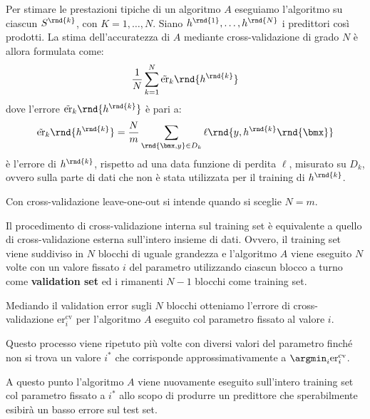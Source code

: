 \documentclass[\main/main.tex]{subfiles}
\begin{document}
\begin{multicols}{2}
\begin{observation}
        Per stimare le prestazioni tipiche di un algoritmo \(A\) eseguiamo l'algoritmo su ciascun \(S^{\rnd{k}}\), con \(K = 1, \ldots, N\). Siano \(h^{\rnd{1}}, \ldots, h^{\rnd{N}}\) i predittori così prodotti. La stima dell'accuratezza di \(A\) mediante cross-validazione di grado \(N\) è allora formulata come:
        \[
            \frac{1}{N}\sum_{k=1}^N \tilde{\text{er}}_k \rnd{h^{\rnd{k}}}
        \]
        dove l'errore \(\tilde{\text{er}}_k \rnd{h^{\rnd{k}}}\) è pari a:
        \[
            \tilde{\text{er}}_k \rnd{h^{\rnd{k}}} = \frac{N}{m} \sum_{\rnd{\bmx, y} \in D_k} \ell\rnd{y, h^{\rnd{k}}\rnd{\bmx}}
        \]
        è l'errore di \(h^{\rnd{k}}\), rispetto ad una data funzione di perdita \(\ell\), misurato su \(D_k\), ovvero sulla parte di dati che non è stata utilizzata per il training di \(h^{\rnd{k}}\).
    \end{observation}
    \begin{definition}
        Con cross-validazione leave-one-out si intende quando si sceglie \(N=m\).
    \end{definition}
    \begin{observation}
        Il procedimento di cross-validazione interna sul training set è equivalente a quello di cross-validazione esterna sull'intero insieme di dati. Ovvero, il training set viene suddiviso in \(N\) blocchi di uguale grandezza e l'algoritmo \(A\) viene eseguito \(N\) volte con un valore fissato \(i\) del parametro utilizzando ciascun blocco a turno come \textbf{validation set} ed i rimanenti \(N-1\) blocchi come training set. 
        
        Mediando il validation error sugli \(N\) blocchi otteniamo l'errore di cross-validazione \(\text{er}_i^{\text{cv}}\) per l'algoritmo \(A\) eseguito col parametro fissato al valore \(i\).
        
        Questo processo viene ripetuto più volte con diversi valori del parametro finché non si trova un valore \(i^*\) che corrisponde approssimativamente a \(\argmin_i\text{er}_i^{\text{cv}}\).
        
        A questo punto l'algoritmo \(A\) viene nuovamente eseguito sull'intero training set col parametro fissato a \(i^*\) allo scopo di produrre un predittore che sperabilmente esibirà un basso errore sul test set.
    \end{observation}
\end{multicols}
\end{document}
